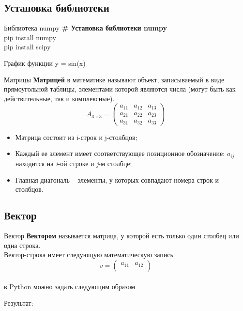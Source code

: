 \documentclass[12pt]{beamer}
\begin{document}
\subsection{Установка библиотеки}
\begin{frame}{Библиотека numpy}
\textbf{\# Установка библиотеки numpy} \\
\vspace{0.5cm}
pip install numpy \\
\vspace{0.2cm}
pip install scipy
\end{frame}


\begin{frame}{График функции y = sin(x)}

\end{frame}


\begin{frame}{Матрицы}
\textbf{Матрицей} в математике называют объект, записываемый в виде прямоугольной таблицы, элементами которой являются числа (могут быть как действительные, так и комплексные). \\
\vspace{0.5cm}
\[
  A_{3\times 3} = 
  \begin{pmatrix}
    a_{11} & a_{12} & a_{13}\\
    a_{21} & a_{22} & a_{23}\\
    a_{31} & a_{32} & a_{33}
  \end{pmatrix}
\]

\begin{itemize}
\item Матрица состоит из i-строк и j-столбцов;
\item Каждый ее элемент имеет соответствующее позиционное обозначение: $a_{ij}$ находится на \emph{i}-ой строке и \emph{j}-м столбце;
\item Главная диагональ -- элементы, у которых совпадают номера строк и столбцов.
\end{itemize}
\end{frame}

\subsection{Вектор}
\begin{frame}{Вектор}
\textbf{Вектором} называется матрица, у которой есть только один столбец или одна строка. \\
\vspace{0.5cm}
Вектор-строка имеет следующую математическую запись
\vspace{0.2cm}
\[
  v = 
  \begin{pmatrix}
    a_{11} & a_{12} \\
  \end{pmatrix}
\]
\\
\vspace{0.2cm}
в Python можно задать следующим образом
\vspace{0.2cm}

\vspace{0.2cm}
Результат: \\

\end{frame}
\end{document}
